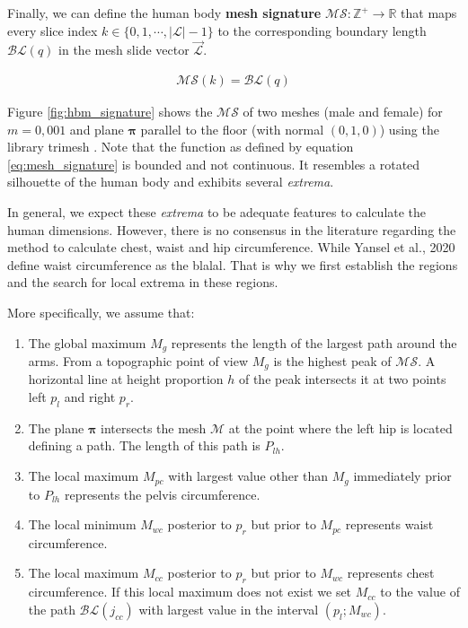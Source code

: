 \documentclass[runningheads, orivec]{llncs}
\begin{document}
Finally, we can define the human body \textbf{mesh signature} $\mathcal{MS}: 
\mathbb{Z}^+ \to \mathbb{R}$ that maps every slice index $k \in \{0, 1, \cdots, 
|\mathcal{L}|-1\}$ to the corresponding boundary length $\mathcal{BL}(q)$ in 
the mesh slide vector $\vec{\mathcal{L}}$.

\begin{align}\label{eq:mesh_signature}
\mathcal{MS}(k) = \mathcal{BL}(q)
\end{align}

Figure \ref{fig:hbm_signature} shows the $\mathcal{MS}$ of two meshes (male 
and female) for 
$m=0,001$ and plane $\boldsymbol{\pi}$ parallel to the floor (with normal $(0, 
1,0)$) using the library trimesh \cite{trimesh}. Note that the function as 
defined by equation \ref{eq:mesh_signature} is bounded and not continuous. It 
resembles a rotated silhouette of the human body and exhibits several 
\textit{extrema}.

In general, we expect these \textit{extrema} to be adequate features to 
calculate the human dimensions. However, there is no consensus in the 
literature regarding the method to calculate chest, waist and hip 
circumference. While Yansel et al., 2020 define waist circumference as the 
blalal. That is why we first establish the regions and the search for local 
extrema in these regions.

More specifically, we assume that:
\begin{enumerate}
	\item The global maximum $M_g$ represents the length of the largest path 
	around the arms. From a topographic point of view $M_g$ is the highest peak 
	of $\mathcal{MS}$. A horizontal line at height proportion $h$ of the peak 
	intersects 
	it at two points left $p_l$ and right $p_r$.
	\item The plane $\boldsymbol{\pi}$ intersects the mesh $\mathcal{M}$ at the 
	point where the left hip is located defining a path. The length of this 
	path is $P_{lh}$.	
	\item The local maximum $M_{pc}$ with largest value other than $M_g$ 
	immediately prior to $P_{lh}$ represents the pelvis circumference.	
	\item The local minimum $M_{wc}$ posterior to $p_r$ but prior to $M_{pc}$ 
	represents waist circumference.
	\item The local maximum $M_{cc}$ posterior to $p_r$ but prior to $M_{wc}$ 
	represents 
	chest circumference. If this local maximum does not exist we set $M_{cc}$ 
	to the value of the path $\mathcal{BL}(j_{cc})$ with largest value in the 
	interval $(p_l; M_{wc})$.
\end{enumerate}
\end{document}
